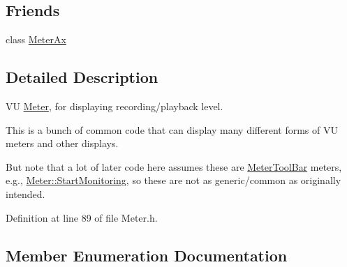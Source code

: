 \subsection*{Friends}
\begin{DoxyCompactItemize}
\item 
class \hyperlink{class_meter_a765f319de3e50dd17e5d63e9b287308f}{Meter\+Ax}
\end{DoxyCompactItemize}


\subsection{Detailed Description}
VU \hyperlink{class_meter}{Meter}, for displaying recording/playback level. 

This is a bunch of common code that can display many different forms of VU meters and other displays.

But note that a lot of later code here assumes these are \hyperlink{class_meter_tool_bar}{Meter\+Tool\+Bar} meters, e.\+g., \hyperlink{class_meter_a518732eb25bdc5ddab7795df10c7857c}{Meter\+::\+Start\+Monitoring}, so these are not as generic/common as originally intended. 

Definition at line 89 of file Meter.\+h.



\subsection{Member Enumeration Documentation}
